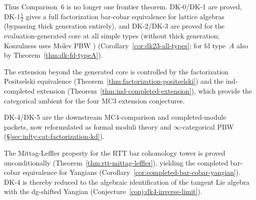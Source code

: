 Thus Comparison~6 is no longer one frontier theorem.  DK-0/DK-1 are proved,
DK-1$\frac{1}{2}$ gives a full factorization bar-cobar equivalence for
lattice algebras (bypassing thick generation entirely),
and DK-2/DK-3 are proved for the evaluation-generated core at all
simple types (without thick generation; Koszulness uses Molev PBW
\cite{molev-yangians})
(Corollary~\ref{cor:dk23-all-types}; for fd type~$A$ also by
Theorem~\ref{thm:dk-fd-typeA}).

The extension beyond the generated core is controlled by the factorization Positselski equivalence
(Theorem~\ref{thm:factorization-positselski}) and the ind-completed
extension (Theorem~\ref{thm:ind-completed-extension}), which provide
the categorical ambient for the four MC3 extension conjectures.

DK-4/DK-5 are the downstream MC4-comparison and completed-module
packets, now reformulated as formal moduli theory and
$\infty$-categorical PBW
(\S\ref{sec:infty-cat-factorization-kd}).

The Mittag-Leffler property for the RTT bar cohomology tower
is proved unconditionally
(Theorem~\ref{thm:rtt-mittag-leffler}), yielding the completed
bar-cobar equivalence for Yangians
(Corollary~\ref{cor:completed-bar-cobar-yangian}).
DK-4 is thereby reduced to the algebraic identification of the
tangent Lie algebra with the dg-shifted Yangian
(Conjecture~\ref{conj:dk4-inverse-limit}).

